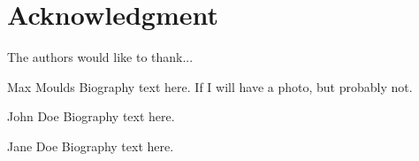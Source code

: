 \documentclass[10pt,journal,compsoc,draftclsnofoot,onecolumn]{IEEEtran}
\begin{document}
  \section*{Acknowledgment}
\fi


The authors would like to thank...


\ifCLASSOPTIONcaptionsoff
  \newpage
\fi




\begin{IEEEbiography}{Max Moulds}
Biography text here. If I will have a photo, but probably not. 
\end{IEEEbiography}

\begin{IEEEbiographynophoto}{John Doe}
Biography text here.
\end{IEEEbiographynophoto}


\begin{IEEEbiographynophoto}{Jane Doe}
Biography text here.
\end{IEEEbiographynophoto}
\end{document}
